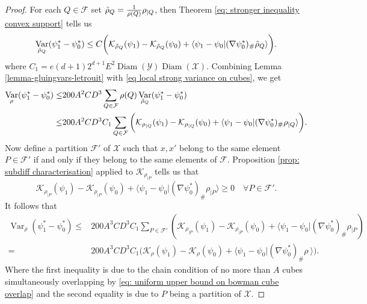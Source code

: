 \documentclass[11pt, oneside, titlepage]{book}
\theoremstyle{plain}
\theoremstyle{definition}
\newcommand{\K}{\mathcal{K}}
\newcommand{\X}{\mathcal{X}}
\newcommand{\Y}{\mathcal{Y}}
\newcommand{\F}{\mathcal{F}}
\DeclareMathOperator{\var}{Var}
\DeclareMathOperator{\diam}{Diam}
\begin{document}
\begin{proof}
For each $Q \in \F$ set $\Tilde{\rho}_Q = \frac{1}{\rho(Q)} \rho_{|Q}$, then Theorem \ref{eq: stronger inequality convex support} tells us
\begin{equation}
\label{eq local strong variance on cubes}
    \var_{\Tilde{\rho}_Q}(\psi_1^* - \psi_0^*) \leq C \bigg(\K_{\Tilde{\rho}_Q}(\psi_1) - \K_{\Tilde{\rho}_Q}(\psi_0) + \langle \psi_1 - \psi_0 | (\nabla\psi_0^*)_\#\Tilde{\rho}_Q \rangle \bigg).
\end{equation}
where $C_1 = e(d+1) 2^{d+1} E^2 \diam(\Y) \diam(\X)$.
Combining Lemma \ref{lemma-gluingvars-letrouit} with \eqref{eq local strong variance on cubes}, we get
\begin{align*}
    \var_\rho(\psi_1^* - \psi_0^*) \leq& 200 A^2 C D^3 \sum_{Q \in \F} \rho(Q) \var_{\Tilde{\rho}_Q}(\psi_1^* - \psi_0^*)\\
    \leq& 200 A^2 C D^3 C_1 \sum_{Q \in \F} \bigg(\K_{\rho_{|Q}}(\psi_1) - \K_{\rho_{|Q}}(\psi_0) + \langle \psi_1 - \psi_0 | (\nabla\psi_0^*)_\#\rho_{|Q} \rangle\bigg).
\end{align*}
Now define a partition $\F'$ of $\X$ such that $x, x'$ belong to the same element $P \in \F'$ if and only if they belong to the same elements of $\F$. Proposition \ref{prop: subdiff characterisation} applied to $\K_{\rho_{|P}}$ tells us that
\begin{equation}
\K_{\rho_{|P}}(\psi_1) - \K_{\rho_{|P}}(\psi_0) + \langle \psi_1 - \psi_0 | (\nabla\psi_0^*)_\# \rho_{|P} \rangle \geq 0 \quad \forall P \in \F'. 
\end{equation}
It follows that
\begin{align*}
    \var_\rho(\psi_1^* - \psi_0^*) \leq& 200 A^3 C D^3 C_1 \sum_{P \in \F'} (\K_{\rho_{|P}}(\psi_1) - \K_{\rho_{|P}}(\psi_0) + \langle \psi_1 - \psi_0 | (\nabla\psi_0^*)_\# \rho_{|P})\\
    =& 200 A^3 C D^3 C_1 \bigg(\K_\rho(\psi_1) - \K_\rho(\psi_0) + \langle \psi_1 - \psi_0 | (\nabla\psi_0^*)_\# \rho\ \rangle \bigg).
\end{align*}
Where the first inequality is due to the chain condition of no more than $A$ cubes simultaneously overlapping by \eqref{eq: uniform upper bound on bowman cube overlap} and the second equality is due to $P$ being a partition of $\X$.
\end{proof}
\end{document}
